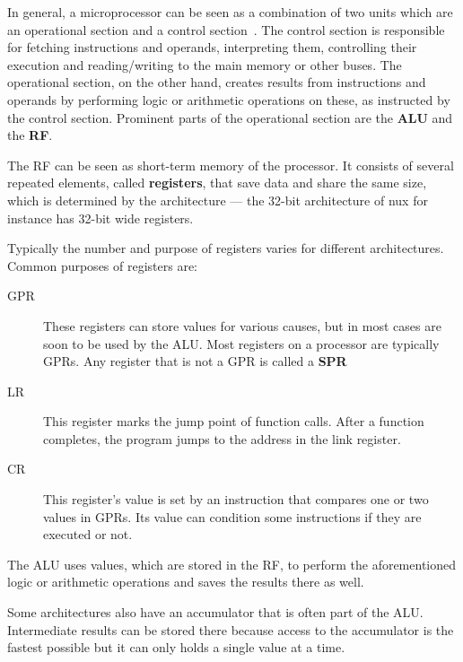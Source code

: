 In general, a microprocessor can be seen as a combination of two units which are an operational section and a control section~\cite[p.~26]{microprocessor}.
The control section is responsible for fetching instructions and operands, interpreting them, controlling their execution and reading/writing to the main memory or other buses.
The operational section, on the other hand, creates results from instructions and operands by performing logic or arithmetic operations on these, as instructed by the control section.
Prominent parts of the operational section are the \textbf{\ac{ALU}} and the \textbf{\ac{RF}}.

The \ac{RF} can be seen as short-term memory of the processor.
It consists of several repeated elements, called \textbf{registers}, that save data and share the same size, which is determined by the architecture --- the 32-bit architecture of nux for instance has 32-bit wide registers.

Typically the number and purpose of registers varies for different architectures.
Common purposes of registers are:
\begin{description}
    \item[\ac{GPR}] These registers can store values for various causes, but in most cases are soon to be used by the ALU. Most registers on a processor are typically \ac{GPR}s.
        Any register that is not a \ac{GPR} is called a \textbf{\ac{SPR}}
    \item[\ac{LR}] This register marks the jump point of function calls. After a function completes, the program jumps to the address in the link register.
    \item[\ac{CR}] This register's value is set by an instruction that compares one or two values in GPRs. Its value can condition some instructions if they are executed or not.
\end{description}        
The \ac{ALU} uses values, which are stored in the \ac{RF}, to perform the aforementioned logic or arithmetic operations and saves the results there as well.

Some architectures also have an accumulator that is often part of the \ac{ALU}.
Intermediate results can be stored there because access to the accumulator is the fastest possible but it can only holds a single value at a time.


